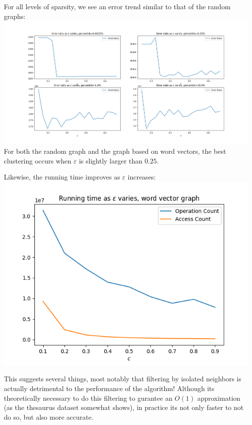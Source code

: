 \documentclass[
]{article}
\begin{document}
For all levels of sparsity, we see an error trend similar to that of the
random graphs:\\
\includegraphics{images/percentile_change.png}\\
For both the random graph and the graph based on word vectors, the best
clustering occurs when {\(\varepsilon\)} is slightly larger than
{\(0.25\)}.

Likewise, the running time improves as {\(\varepsilon\)} increases:\\
\includegraphics{images/running_time_as_eps_varies_word_vector.png}

This suggests several things, most notably that filtering by isolated
neighbors is actually detrimental to the performance of the algorithm!
Although it\textquotesingle s theoretically necessary to do this
filtering to gurantee an {\(O(1)\)} approximation (as the thesaurus
dataset somewhat shows), in practice it\textquotesingle s not only
faster to not do so, but also more accurate.
\end{document}
